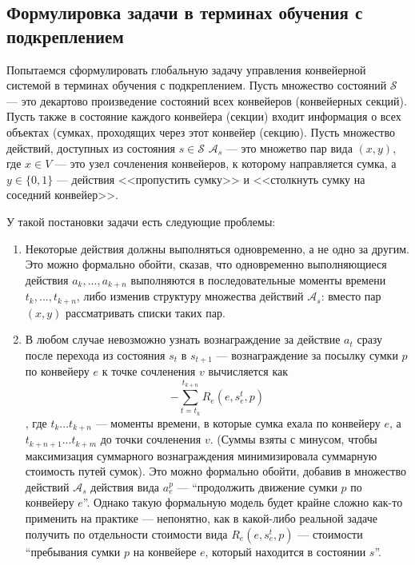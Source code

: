 \documentclass[specification,annotation,times]{itmo-student-thesis}
\theoremstyle{definition}
\begin{document}
\subsection{Формулировка задачи в терминах обучения с подкреплением}\label{rl-task-formulation}

Попытаемся сформулировать глобальную задачу управления конвейерной системой в
терминах обучения с подкреплением. Пусть множество состояний $\mathcal{S}$ ---
это декартово произведение состояний всех конвейеров (конвейерных секций). Пусть
также в состояние каждого конвейера (секции) входит информация о всех объектах
(сумках, проходящих через этот конвейер (секцию). Пусть множество действий,
доступных из состояния $s \in \mathcal{S}$ $\mathcal{A}_s$ --- это множетво пар
вида $(x,y)$, где $x \in V$ --- это узел сочленения конвейеров, к которому
направляется сумка, а $y \in \{ 0, 1 \}$ --- действия <<пропустить сумку>> и
<<столкнуть сумку на соседний конвейер>>.

У такой постановки задачи есть следующие проблемы:
\begin{enumerate}
\item Некоторые действия должны выполняться одновременно, а не одно за другим.
  Это можно формально обойти, сказав, что одновременно выполняющиеся действия
  $a_k, ... , a_{k+n}$ выполняются в последовательные моменты времени
  $t_k, ... , t_{k+n}$, либо изменив структуру множества действий
  $\mathcal{A}_s$: вместо пар $(x, y)$ рассматривать списки таких пар.
\item В любом случае невозможно узнать вознаграждение за действие $a_t$ сразу
  после перехода из состояния $s_t$ в $s_{t+1}$ --- вознаграждение за посылку
  сумки $p$ по конвейеру $e$ к точке сочленения $v$ вычисляется как
  \[
  - \sum\limits_{t=t_k}^{t_{k+n}} {R_e(e, s_e^t, p)}
  \]
  , где $t_k ... t_{k+n}$ --- моменты времени, в которые сумка ехала по
  конвейеру $e$, а $t_{k+n+1} ... t_{k+m}$ до точки сочленения $v$. (Суммы взяты
  с минусом, чтобы максимизация суммарного вознаграждения минимизировала
  суммарную стоимость путей сумок). Это можно формально обойти, добавив в
  множество действий $\mathcal{A}_s$ действия вида $a_e^p$ ---
  \enquote{продолжить движение сумки $p$ по конвейеру $e$}. Однако такую
  формальную модель будет крайне сложно как-то применить на практике ---
  непонятно, как в какой-либо реальной задаче получить по отдельности стоимости
  вида $R_e(e, s_e^t, p)$ --- стоимости \enquote{пребывания сумки $p$ на конвейере
    $e$, который находится в состоянии $s$}.
\end{enumerate}
\end{document}
